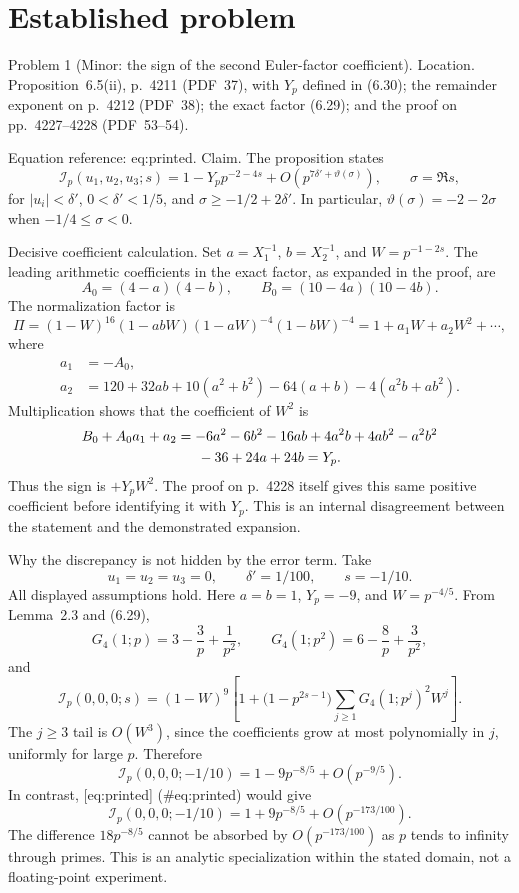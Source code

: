 \documentclass[10pt]{article}
\begin{document}
\section*{Established problem}
Problem 1 (Minor: the sign of the second Euler-factor coefficient).  Location. Proposition 6.5(ii), p. 4211 (PDF 37), with \(Y_p\) defined in (6.30); the remainder exponent on p. 4212 (PDF 38); the exact factor (6.29); and the proof on pp. 4227–4228 (PDF 53–54).\par
Equation reference: eq:printed. Claim. The proposition states \[
\mathcal I_p(u_1,u_2,u_3;s)
=1-Y_p p^{-2-4s}+O\!\left(p^{7\delta'+\vartheta(\sigma)}\right),
\qquad \sigma=\Re s,\] for \(|u_i|<\delta'\), \(0<\delta'<1/5\), and \(\sigma\ge-1/2+2\delta'\). In particular, \(\vartheta(\sigma)=-2-2\sigma\) when \(-1/4\le\sigma<0\).\par
Decisive coefficient calculation. Set \(a=X_1^{-1}\), \(b=X_2^{-1}\), and \(W=p^{-1-2s}\). The leading arithmetic coefficients in the exact factor, as expanded in the proof, are \[A_0=(4-a)(4-b),\qquad B_0=(10-4a)(10-4b).\] The normalization factor is \[\Pi=(1-W)^{16}(1-abW)(1-aW)^{-4}(1-bW)^{-4}
=1+a_1W+a_2W^2+\cdots,\] where \[\begin{aligned}
a_1&=-A_0,\\
a_2&=120+32ab+10(a^2+b^2)-64(a+b)-4(a^2b+ab^2).\end{aligned}\] Multiplication shows that the coefficient of \(W^2\) is \[\begin{aligned}
B_0+A_0a_1+a_2
&=-6a^2-6b^2-16ab+4a^2b+4ab^2-a^2b^2\\
&\hspace{1.5em}-36+24a+24b
=Y_p .\end{aligned}\] Thus the sign is \(+Y_pW^2\). The proof on p. 4228 itself gives this same positive coefficient before identifying it with \(Y_p\). This is an internal disagreement between the statement and the demonstrated expansion.\par
Why the discrepancy is not hidden by the error term. Take \[u_1=u_2=u_3=0,\qquad \delta'=1/100,\qquad s=-1/10.\] All displayed assumptions hold. Here \(a=b=1\), \(Y_p=-9\), and \(W=p^{-4/5}\). From Lemma 2.3 and (6.29), \[G_4(1;p)=3-\frac3p+\frac1{p^2},\qquad
G_4(1;p^2)=6-\frac8p+\frac3{p^2},\] and \[\mathcal I_p(0,0,0;s)
=(1-W)^9
\left[1+\big(1-p^{2s-1}\big)
 \sum_{j\ge1}G_4(1;p^j)^2W^j\right].\] The \(j\ge3\) tail is \(O(W^3)\), since the coefficients grow at most polynomially in \(j\), uniformly for large \(p\). Therefore \[\mathcal I_p(0,0,0;-1/10)
=1-9p^{-8/5}+O(p^{-9/5}).\] In contrast, [eq:printed] (\#eq:printed) would give \[\mathcal I_p(0,0,0;-1/10)
=1+9p^{-8/5}+O(p^{-173/100}).\] The difference \(18p^{-8/5}\) cannot be absorbed by \(O(p^{-173/100})\) as \(p\) tends to infinity through primes. This is an analytic specialization within the stated domain, not a floating-point experiment.\par
\end{document}
